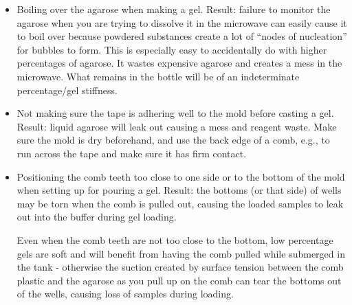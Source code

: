 \documentclass[
  letterpaper,
  DIV=11,
  numbers=noendperiod]{scrreprt}
\begin{document}
\begin{itemize}
\item
  Boiling over the agarose when making a gel. Result: failure to monitor
  the agarose when you are trying to dissolve it in the microwave can
  easily cause it to boil over because powdered substances create a lot
  of ``nodes of nucleation'' for bubbles to form. This is especially
  easy to accidentally do with higher percentages of agarose. It wastes
  expensive agarose and creates a mess in the microwave. What remains in
  the bottle will be of an indeterminate percentage/gel stiffness.
\item
  Not making sure the tape is adhering well to the mold before casting a
  gel. Result: liquid agarose will leak out causing a mess and reagent
  waste. Make sure the mold is dry beforehand, and use the back edge of
  a comb, e.g., to run across the tape and make sure it has firm
  contact.
\item
  Positioning the comb teeth too close to one side or to the bottom of
  the mold when setting up for pouring a gel. Result: the bottoms (or
  that side) of wells may be torn when the comb is pulled out, causing
  the loaded samples to leak out into the buffer during gel loading.

  \begin{tcolorbox}[enhanced jigsaw, rightrule=.15mm, title=\textcolor{quarto-callout-important-color}{\faExclamation}\hspace{0.5em}{NOTE}, titlerule=0mm, opacitybacktitle=0.6, toprule=.15mm, bottomrule=.15mm, opacityback=0, left=2mm, colframe=quarto-callout-important-color-frame, breakable, coltitle=black, colback=white, colbacktitle=quarto-callout-important-color!10!white, bottomtitle=1mm, leftrule=.75mm, toptitle=1mm, arc=.35mm]

  Even when the comb teeth are not too close to the bottom, low
  percentage gels are soft and will benefit from having the comb pulled
  while submerged in the tank - otherwise the suction created by surface
  tension between the comb plastic and the agarose as you pull up on the
  comb can tear the bottoms out of the wells, causing loss of samples
  during loading.


\end{tcolorbox}
\end{itemize}
\end{document}
